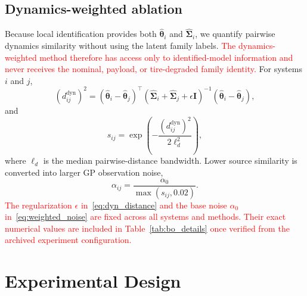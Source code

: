 \documentclass[conference]{IEEEtran}
\newcommand{\rev}[1]{\textcolor{red}{#1}}
\newcommand{\distdyn}{d^{\mathrm{dyn}}}
\begin{document}
\subsection{Dynamics-weighted ablation}
Because local identification provides both $\hat{\boldsymbol{\theta}}_i$ and $\hat{\boldsymbol{\Sigma}}_i$, we quantify pairwise dynamics similarity without using the latent family labels. \rev{The dynamics-weighted method therefore has access only to identified-model information and never receives the nominal, payload, or tire-degraded family identity.}
For systems $i$ and $j$,
\begin{equation}
(\distdyn_{ij})^2=\left(\hat{\boldsymbol{\theta}}_i-\hat{\boldsymbol{\theta}}_j\right)^\top\left(\hat{\boldsymbol{\Sigma}}_i+\hat{\boldsymbol{\Sigma}}_j+\epsilon\mathbf{I}\right)^{-1}\left(\hat{\boldsymbol{\theta}}_i-\hat{\boldsymbol{\theta}}_j\right),
\label{eq:dyn_distance}
\end{equation}
and
\begin{equation}
 s_{ij}=\exp\left(-\frac{(\distdyn_{ij})^2}{2\ell_d^2}\right),
 \label{eq:dyn_similarity}
\end{equation}
where $\ell_d$ is the median pairwise-distance bandwidth. Lower source similarity is converted into larger GP observation noise,
\begin{equation}
 \alpha_{ij}=\frac{\alpha_0}{\max(s_{ij},0.02)}.
 \label{eq:weighted_noise}
\end{equation}
\rev{The regularization $\epsilon$ in~\eqref{eq:dyn_distance} and the base noise $\alpha_0$ in~\eqref{eq:weighted_noise} are fixed across all systems and methods. Their exact numerical values are included in Table~\ref{tab:bo_details} once verified from the archived experiment configuration.}

\section{Experimental Design}
\end{document}
